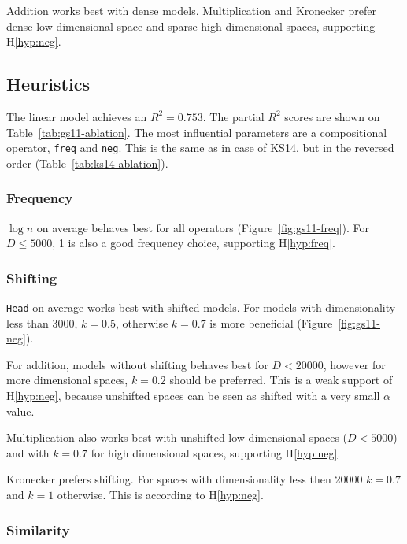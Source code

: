Addition works best with dense models. Multiplication and Kronecker prefer dense low dimensional space and sparse high dimensional spaces, supporting H\ref{hyp:neg}.

\subsection{Heuristics}
\label{sec:heuristics-gs11}



The linear model achieves an $R^2 = 0.753$. The partial $R^2$ scores are shown on Table~\ref{tab:gs11-ablation}. The most influential parameters are a compositional operator, \texttt{freq} and \texttt{neg}. This is the same as in case of KS14, but in the reversed order (Table~\ref{tab:ks14-ablation}).


\subsubsection{Frequency}



$\log n$ on average behaves best for all operators (Figure~\ref{fig:gs11-freq}). For $D \leq 5000$, 1 is also a good frequency choice, supporting H\ref{hyp:freq}.

\subsubsection{Shifting}

\texttt{Head} on average works best with shifted models. For models with dimensionality less than 3000, $k = 0.5$, otherwise $k = 0.7$ is more beneficial (Figure~\ref{fig:gs11-neg}).

For addition, models without shifting behaves best for $D < 20000$, however for more dimensional spaces, $k = 0.2$ should be preferred. This is a weak support of H\ref{hyp:neg}, because unshifted spaces can be seen as shifted with a very small $\alpha$ value.

Multiplication also works best with unshifted low dimensional spaces ($D < 5000$) and with $k = 0.7$ for high dimensional spaces, supporting H\ref{hyp:neg}.

Kronecker prefers shifting. For spaces with dimensionality less then 20000 $k = 0.7$ and $k = 1$ otherwise. This is according to H\ref{hyp:neg}.

\subsubsection{Similarity}

